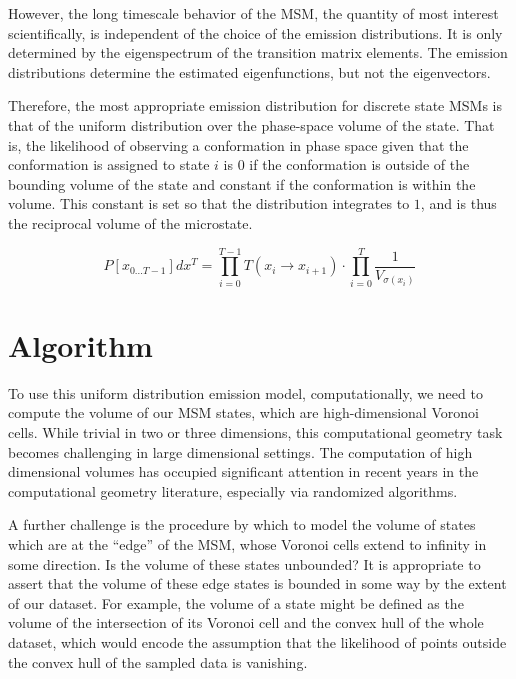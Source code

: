 \documentclass[twocolumn,floatfix,nofootinbib,aps]{revtex4-1}
\begin{document}
However, the long timescale behavior of the MSM, the quantity of most
interest scientifically, is independent of the choice of the emission
distributions. It is only determined by the eigenspectrum of the
transition matrix elements. The emission distributions determine the
estimated eigenfunctions, but not the eigenvectors.

Therefore, the most appropriate emission distribution for discrete state
MSMs is that of the uniform distribution over the phase-space volume of
the state. That is, the likelihood of observing a conformation in phase
space given that the conformation is assigned to state $i$ is $0$
if the conformation is outside of the bounding volume of the state and
constant if the conformation is within the volume. This constant is set
so that the distribution integrates to $1$, and is thus the reciprocal
volume of the microstate.


\begin{equation}
\label{eq:like_vol}
P[x_{0...T-1}] dx^T = \prod_{i=0}^{T-1} T(x_i \rightarrow x_{i+1}) \cdot \prod_{i=0}^T \frac{1}{V_{\sigma(x_{i})}}
\end{equation}

\section{Algorithm}

To use this uniform distribution emission model, computationally, we
need to compute the volume of our MSM states, which are high-dimensional
Voronoi cells. While trivial in two or three dimensions, this
computational geometry task becomes challenging in large dimensional
settings. The computation of high dimensional volumes has occupied significant
attention in recent years in the computational geometry literature, especially
via randomized algorithms.\cite{Simonovits03, Lovasz03}

A further challenge is the procedure by which to model the volume of states which are at the ``edge'' of the MSM, whose Voronoi cells extend to infinity in some direction. Is the volume of these states unbounded? It is appropriate to assert that the volume of these edge states is bounded in some way by the extent of our dataset. For example, the volume of a state might be defined as the volume of the intersection of its Voronoi cell and the convex hull of the whole dataset, which would encode the assumption that the likelihood of points
outside the convex hull of the sampled data is vanishing.
\end{document}
